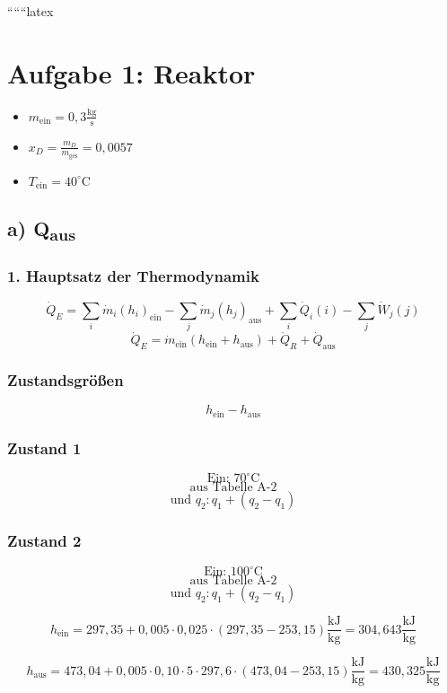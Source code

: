 
``````latex


\section*{Aufgabe 1: Reaktor}

\begin{itemize}
    \item $m_{\text{ein}} = 0,3 \frac{\text{kg}}{\text{s}}$
    \item $x_D = \frac{m_D}{m_{\text{ges}}} = 0,0057$
    \item $T_{\text{ein}} = 40^\circ \text{C}$
\end{itemize}

\subsection*{a) Q\textsubscript{aus}}

\subsubsection*{1. Hauptsatz der Thermodynamik}
\[
\dot{Q}_E = \sum_i \dot{m}_i (h_i)_{\text{ein}} - \sum_j \dot{m}_j (h_j)_{\text{aus}} + \sum_i \dot{Q}_i (i) - \sum_j \dot{W}_j (j)
\]
\[
\dot{Q}_E = \dot{m}_{\text{ein}} (h_{\text{ein}} + h_{\text{aus}}) + \dot{Q}_R + \dot{Q}_{\text{aus}}
\]

\subsubsection*{Zustandsgrößen}
\[
h_{\text{ein}} - h_{\text{aus}}
\]

\subsubsection*{Zustand 1}
\[
\text{Ein: } 70^\circ \text{C}
\]
\[
\text{aus Tabelle A-2}
\]
\[
\text{und } q_2: q_1 + (q_2 - q_1)
\]

\subsubsection*{Zustand 2}
\[
\text{Ein: } 100^\circ \text{C}
\]
\[
\text{aus Tabelle A-2}
\]
\[
\text{und } q_2: q_1 + (q_2 - q_1)
\]

\[
h_{\text{ein}} = 297,35 + 0,005 \cdot 0,025 \cdot (297,35 - 253,15) \frac{\text{kJ}}{\text{kg}} = 304,643 \frac{\text{kJ}}{\text{kg}}
\]

\[
h_{\text{aus}} = 473,04 + 0,005 \cdot 0,10 \cdot 5 \cdot 297,6 \cdot (473,04 - 253,15) \frac{\text{kJ}}{\text{kg}} = 430,325 \frac{\text{kJ}}{\text{kg}}
\]

